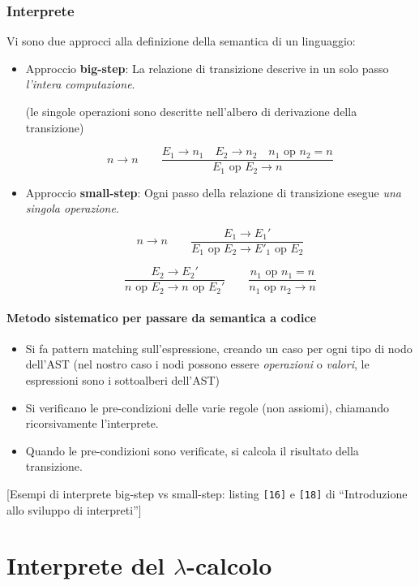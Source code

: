 \documentclass[a4paper,10pt]{article}
\begin{document}
\subsubsection{Interprete}
\label{bs_ss}
Vi sono due approcci alla definizione della semantica di un linguaggio:

\begin{itemize}
 \item Approccio \textbf{big-step}:
 La relazione di transizione descrive in un solo passo \emph{l'intera computazione}.
 
 (le singole operazioni sono descritte nell'albero di derivazione della transizione)
 
 \[n \to n \quad\quad \dfrac{E_1 \to n_1 \quad E_2 \to n_2 \quad n_1 \text{ op }n_2 = n}{E_1 \text{ op }E_2 \to n} \] 
 \item Approccio \textbf{small-step}: Ogni passo della relazione di transizione esegue \emph{una singola operazione}.
 
 \[ n \to n \quad \quad \dfrac{E_1 \to E_1 '}{E_1 \text{ op }E_2 \to E'_1 \text{ op } E_2} \]

 \[\dfrac{E_2 \to E_2 '}{n \text{ op }E_2 \to n \text{ op } E_2'} \quad \quad \dfrac{n_1 \text{ op } n_1 = n}{n_1\text{ op } n_2 \to n} \]
 
\end{itemize}
 \paragraph{Metodo sistematico per passare da semantica a codice}
 \begin{itemize}
  \item Si fa pattern matching sull'espressione, creando un caso per ogni tipo di nodo dell'AST (nel nostro caso i nodi possono essere \emph{operazioni} o \emph{valori}, le espressioni sono i sottoalberi dell'AST)
  \item  Si verificano le pre-condizioni delle varie regole (non assiomi), chiamando ricorsivamente l'interprete.
  \item Quando le pre-condizioni sono verificate, si calcola il risultato della transizione.
 \end{itemize}

 [Esempi di interprete big-step vs small-step: listing \texttt{[16]} e \texttt{[18]} di ``Introduzione allo sviluppo di interpreti'']

 \section{Interprete del $\lambda$-calcolo}
\end{document}
